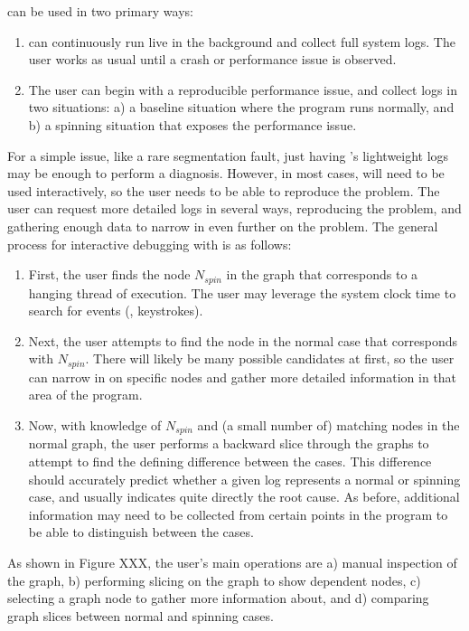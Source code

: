\xxx can be used in two primary ways:
\begin{enumerate}
    \item \xxx can continuously run live in the background and collect full
    system logs. The user works as usual until a crash or performance issue is
    observed.

    \item The user can begin with a reproducible performance issue, and collect
    logs in two situations: a) a baseline situation where the program runs
    normally, and b) a spinning situation that exposes the performance issue.

\end{enumerate}
For a simple issue, like a rare segmentation fault, just having \xxx's lightweight logs may be enough to perform a diagnosis.
However, in most cases, \xxx will need to be used interactively, so the user needs to be able to reproduce the problem.
The user can request more detailed logs in several ways, reproducing the problem, and gathering enough data to narrow in even further on the problem.
The general process for interactive debugging with \xxx is as follows:
\begin{enumerate}
    \item First, the user finds the node \emph{$N_{spin}$} in the \xxx graph
    that corresponds to a hanging thread of execution. The user may leverage
    the system clock time to search for events (\eg, keystrokes).

    \item Next, the user attempts to find the node in the normal case that
    corresponds with $N_{spin}$. There will likely be many possible candidates
    at first, so the user can narrow in on specific nodes and gather more
    detailed information in that area of the program.

    \item Now, with knowledge of $N_{spin}$ and (a small number of) matching
    nodes in the normal graph, the user performs a backward slice through the
    graphs to attempt to find the defining difference between the cases. This
    difference should accurately predict whether a given log represents a
    normal or spinning case, and usually indicates quite directly the root
    cause. As before, additional information may need to be collected from
    certain points in the program to be able to distinguish between the cases.

\end{enumerate}
As shown in Figure XXX, the user's main operations are a) manual inspection of
the graph, b) performing slicing on the graph to show dependent nodes, c)
selecting a graph node to gather more information about, and d) comparing graph
slices between normal and spinning cases.
